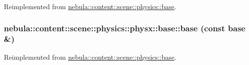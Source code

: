 Reimplemented from \hyperlink{classnebula_1_1content_1_1scene_1_1physics_1_1base_a22b1b24ef86af14ab7f0aa08c2795dc2}{nebula::content::scene::physics::base}.\hypertarget{classnebula_1_1content_1_1scene_1_1physics_1_1physx_1_1base_a673ce31a72310cd821bef9b717f3e139}{
\subsubsection[{base}]{\setlength{\rightskip}{0pt plus 5cm}nebula::content::scene::physics::physx::base::base (const {\bf base} \&)}}
\label{classnebula_1_1content_1_1scene_1_1physics_1_1physx_1_1base_a673ce31a72310cd821bef9b717f3e139}


Reimplemented from \hyperlink{classnebula_1_1content_1_1scene_1_1physics_1_1base_ad93721a533dbf5273c723e90d858b0d4}{nebula::content::scene::physics::base}.

